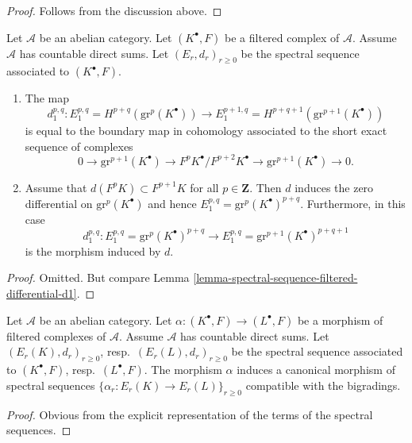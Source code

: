 \begin{proof}
Follows from the discussion above.
\end{proof}

\begin{lemma}
\label{lemma-spectral-sequence-filtered-complex-d1}
Let $\mathcal{A}$ be an abelian category.
Let $(K^\bullet, F)$ be a filtered complex of $\mathcal{A}$.
Assume $\mathcal{A}$ has countable direct sums.
Let $(E_r, d_r)_{r \geq 0}$ be the spectral sequence
associated to $(K^\bullet, F)$.
\begin{enumerate}
\item The map
$$
d_1^{p, q} : 
E_1^{p, q} = H^{p + q}(\text{gr}^p(K^\bullet))
\longrightarrow
E_1^{p + 1, q} = H^{p + q + 1}(\text{gr}^{p + 1}(K^\bullet))
$$
is equal to the boundary map in cohomology associated to the short
exact sequence of complexes
$$
0 \to \text{gr}^{p + 1}(K^\bullet) \to
F^pK^\bullet/F^{p + 2}K^\bullet \to \text{gr}^{p + 1}(K^\bullet) \to 0.
$$
\item Assume that $d(F^pK) \subset F^{p + 1}K$ for all $p \in \mathbf{Z}$.
Then $d$ induces the zero differential on $\text{gr}^p(K^\bullet)$
and hence
$E_1^{p, q} = \text{gr}^p(K^\bullet)^{p + q}$.
Furthermore, in this case
$$
d_1^{p, q} :
E_1^{p, q} = \text{gr}^p(K^\bullet)^{p + q}
\longrightarrow
E_1^{p, q} = \text{gr}^{p + 1}(K^\bullet)^{p + q + 1}
$$
is the morphism induced by $d$.
\end{enumerate}
\end{lemma}

\begin{proof}
Omitted. But compare
Lemma \ref{lemma-spectral-sequence-filtered-differential-d1}.
\end{proof}

\begin{lemma}
\label{lemma-spectral-sequence-filtered-complex-functorial}
Let $\mathcal{A}$ be an abelian category.
Let $\alpha : (K^\bullet, F) \to (L^\bullet, F)$ be a morphism of
filtered complexes of $\mathcal{A}$. Assume $\mathcal{A}$ has
countable direct sums. Let $(E_r(K), d_r)_{r \geq 0}$, resp.\ 
$(E_r(L), d_r)_{r \geq 0}$ be the spectral sequence associated
to $(K^\bullet, F)$, resp.\ $(L^\bullet, F)$.
The morphism $\alpha$ induces a canonical morphism of spectral
sequences $\{\alpha_r : E_r(K) \to E_r(L)\}_{r \geq 0}$ compatible
with the bigradings.
\end{lemma}

\begin{proof}
Obvious from the explicit representation of the terms of the
spectral sequences.
\end{proof}

